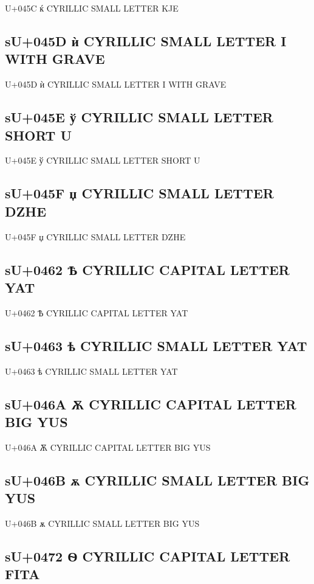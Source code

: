 U+045C ќ  CYRILLIC SMALL LETTER KJE

\subsection{sU+045D ѝ  CYRILLIC SMALL LETTER I WITH GRAVE}

U+045D ѝ  CYRILLIC SMALL LETTER I WITH GRAVE

\subsection{sU+045E ў  CYRILLIC SMALL LETTER SHORT U}

U+045E ў  CYRILLIC SMALL LETTER SHORT U

\subsection{sU+045F џ  CYRILLIC SMALL LETTER DZHE}

U+045F џ  CYRILLIC SMALL LETTER DZHE

\subsection{sU+0462 Ѣ  CYRILLIC CAPITAL LETTER YAT}

U+0462 Ѣ  CYRILLIC CAPITAL LETTER YAT

\subsection{sU+0463 ѣ  CYRILLIC SMALL LETTER YAT}

U+0463 ѣ  CYRILLIC SMALL LETTER YAT

\subsection{sU+046A Ѫ  CYRILLIC CAPITAL LETTER BIG YUS}

U+046A Ѫ  CYRILLIC CAPITAL LETTER BIG YUS

\subsection{sU+046B ѫ  CYRILLIC SMALL LETTER BIG YUS}

U+046B ѫ  CYRILLIC SMALL LETTER BIG YUS

\subsection{sU+0472 Ѳ  CYRILLIC CAPITAL LETTER FITA}

